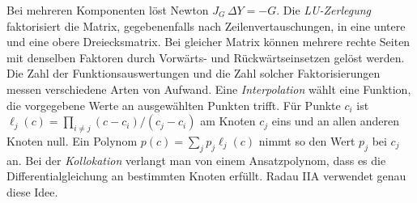 Bei mehreren Komponenten löst Newton \(J_G\,\Delta Y=-G\). Die \emph{LU-Zerlegung} faktorisiert die Matrix, gegebenenfalls nach Zeilenvertauschungen, in eine untere und eine obere Dreiecksmatrix. Bei gleicher Matrix können mehrere rechte Seiten mit denselben Faktoren durch Vorwärts- und Rückwärtseinsetzen gelöst werden. Die Zahl der Funktionsauswertungen und die Zahl solcher Faktorisierungen messen verschiedene Arten von Aufwand.
Eine \emph{Interpolation} wählt eine Funktion, die vorgegebene Werte an ausgewählten Punkten trifft. Für Punkte \(c_i\) ist \(\ell_j(c)=\prod_{i\ne j}(c-c_i)/(c_j-c_i)\) am Knoten \(c_j\) eins und an allen anderen Knoten null. Ein Polynom \(p(c)=\sum_j p_j\ell_j(c)\) nimmt so den Wert \(p_j\) bei \(c_j\) an. Bei der \emph{Kollokation} verlangt man von einem Ansatzpolynom, dass es die Differentialgleichung an bestimmten Knoten erfüllt. Radau IIA verwendet genau diese Idee.

